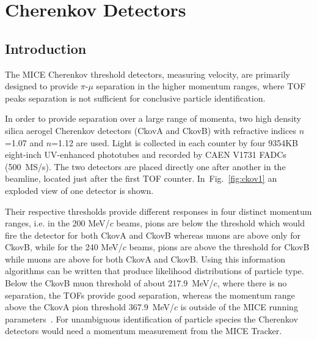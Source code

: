 \graphicspath{{03-Ckov/Figures/}}

\section{Cherenkov Detectors}
\label{Sect:Ckov}

\subsection{Introduction}
\label{SubSect:Ckov_Intro}

The MICE Cherenkov threshold detectors, measuring velocity, are primarily designed to provide $\pi$-$\mu$ separation in the higher momentum ranges, where TOF peaks separation is not sufficient for conclusive particle identification.

In order to provide separation over a large range of momenta, two high density silica aerogel Cherenkov detectors (CkovA and CkovB) with refractive indices $n$=1.07 and $n$=1.12 are used.
Light is collected in each counter by four 9354KB eight-inch UV-enhanced phototubes and recorded by CAEN V1731 FADCs (500~MS/s).
The two detectors are placed directly one after another in the beamline, located just after the first TOF counter. In~Fig.~\ref{fig:ckov1} an exploded view of one detector is shown.

Their respective thresholds provide different responses in four distinct momentum ranges, i.e. in the 200 MeV/$c$ beams, pions are below the threshold which would fire the detector for both CkovA and CkovB whereas muons are above only for CkovB, while for the 240 MeV/$c$ beams, pions are above the threshold for CkovB while muons are above for both CkovA and CkovB. Using this information algorithms can be written that produce likelihood distributions of particle type.
Below the CkovB muon threshold of about 217.9~MeV/$c$, where there is no separation, the TOFs provide good separation, whereas the momentum range above the CkovA pion threshold 367.9~MeV/$c$ is outside of the MICE running parameters~\cite{NOTE473}.
For unambiguous identification of particle species the Cherenkov detectors would need a momentum measurement from the MICE Tracker.

